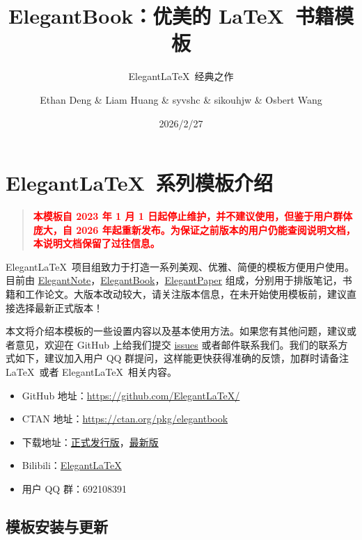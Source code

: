 \documentclass[lang=cn,newtx,10pt,scheme=chinese]{elegantbook}
\title{ElegantBook：优美的 \LaTeX\ 书籍模板}
\subtitle{Elegant\LaTeX\ 经典之作}
\author{Ethan Deng \& Liam Huang \& syvshc \& sikouhjw \& Osbert Wang}
\institute{Elegant\LaTeX\ Program}
\date{2026/2/27}
\begin{document}
\maketitle
\frontmatter

\tableofcontents

\mainmatter

\chapter{Elegant\LaTeX\ 系列模板介绍}

\begin{quotation}
  \textbf{\textcolor{red}{本模板自 2023 年 1 月 1 日起停止维护，并不建议使用，但鉴于用户群体庞大，自 2026 年起重新发布。为保证之前版本的用户仍能查阅说明文档，本说明文档保留了过往信息。}}
\end{quotation}

Elegant\LaTeX\ 项目组致力于打造一系列美观、优雅、简便的模板方便用户使用。目前由 \href{https://github.com/ElegantLaTeX/ElegantNote}{ElegantNote}，\href{https://github.com/ElegantLaTeX/ElegantBook}{ElegantBook}，\href{https://github.com/ElegantLaTeX/ElegantPaper}{ElegantPaper} 组成，分别用于排版笔记，书籍和工作论文。大版本改动较大，请关注版本信息，在未开始使用模板前，建议直接选择最新正式版本！


本文将介绍本模板的一些设置内容以及基本使用方法。如果您有其他问题，建议或者意见，欢迎在 GitHub 上给我们提交 \href{https://github.com/ElegantLaTeX/ElegantBook/issues}{issues} 或者邮件联系我们。我们的联系方式如下，建议加入用户 QQ 群提问，这样能更快获得准确的反馈，加群时请备注 \LaTeX\ 或者 Elegant\LaTeX\ 相关内容。
\begin{itemize}
  \item GitHub 地址：\href{https://github.com/ElegantLaTeX/}{https://github.com/ElegantLaTeX/}
  \item CTAN 地址：\href{https://ctan.org/pkg/elegantbook}{https://ctan.org/pkg/elegantbook}
  \item 下载地址：\href{https://github.com/ElegantLaTeX/ElegantBook/releases}{正式发行版}，\href{https://github.com/ElegantLaTeX/ElegantBook/archive/master.zip}{最新版}
  \item Bilibili：\href{https://space.bilibili.com/516479629}{ElegantLaTeX}
  \item 用户 QQ 群：692108391
\end{itemize}


\section{模板安装与更新}
\end{document}
